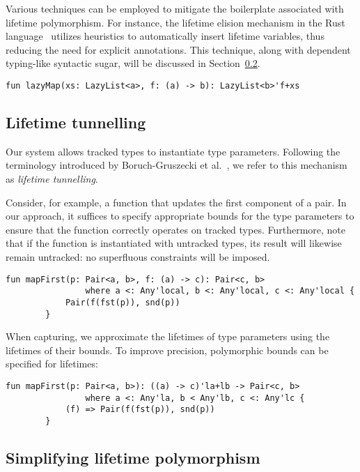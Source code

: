 \documentclass[11pt]{article}
\begin{document}
    Various techniques can be employed to mitigate the boilerplate associated with lifetime polymorphism.
    For instance, the lifetime elision mechanism in the Rust language~\cite{matsakis2014rust} utilizes heuristics to automatically insert lifetime variables, thus reducing the need for explicit annotations.
    This technique, along with dependent typing-like syntactic sugar, will be discussed in Section~\ref{subsec:lifetime-poly-enhancement}.
    \begin{lstlisting}[language=colang]
    fun lazyMap(xs: LazyList<a>, f: (a) -> b): LazyList<b>'f+xs
    \end{lstlisting}


    \subsection{Lifetime tunnelling}

    Our system allows tracked types to instantiate type parameters.
    Following the terminology introduced by Boruch-Gruszecki et al.~\cite{boruch2023capturing}, we refer to this mechanism as \emph{lifetime tunnelling}.

    Consider, for example, a function that updates the first component of a pair.
    In our approach, it suffices to specify appropriate bounds for the type parameters to ensure that the function correctly operates on tracked types.
    Furthermore, note that if the function is instantiated with untracked types, its result will likewise remain untracked: no superfluous constraints will be imposed.
    \begin{lstlisting}[language=colang]
        fun mapFirst(p: Pair<a, b>, f: (a) -> c): Pair<c, b>
                where a <: Any'local, b <: Any'local, c <: Any'local {
            Pair(f(fst(p)), snd(p))
        }
    \end{lstlisting}

    When capturing, we approximate the lifetimes of type parameters using the
    lifetimes of their bounds.
    To improve precision, polymorphic bounds can
    be specified for lifetimes:
    \begin{lstlisting}[language=colang]
        fun mapFirst(p: Pair<a, b>): ((a) -> c)'la+lb -> Pair<c, b>
                where a <: Any'la, b < Any'lb, c <: Any'lc {
            (f) => Pair(f(fst(p)), snd(p))
        }
    \end{lstlisting}

    \subsection{Simplifying lifetime polymorphism} \label{subsec:lifetime-poly-enhancement}
\end{document}

